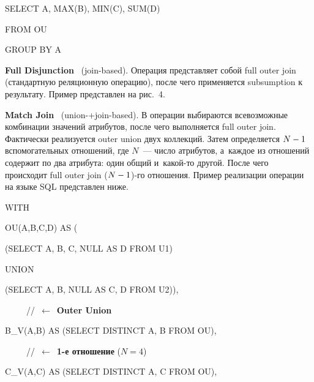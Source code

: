 \begin{multicols}{2}
\noindent
\hspace*{12pt}{\sf UNION (ALL)}

\noindent
\hspace*{3pt}{\sf (SELECT A, B, NULL AS C, D FROM U2)),}


\noindent
{\sf SELECT A, MAX(B),  MIN(C), SUM(D)}

\noindent
{\sf FROM 	OU}

\noindent
{\sf GROUP BY A}

\smallskip

\textbf{Full Disjunction}~\cite{37-vov} (join-based). Операция представляет собой
{\sf full outer join} (стандартную реляционную операцию), после чего
применяется {\sf subsumption} к результату. Пример представлен на рис.~4.



  \textbf{Match Join}~\cite{11-vov} (union-\;+\;join-based). В операции выбираются
всевозможные комбинации значений атрибутов, после чего выполняется
{\sf full
outer join}. Фактически реализуется {\sf outer union} двух коллекций. Затем
определяется $N\hm-1$ вспомогательных отношений, где $N$~--- число атрибутов,
  а~каж\-дое из отношений содержит по два атрибута: один общий и~какой-то другой.
После чего происходит {\sf full outer join} ($N\hm-1$)-го отношения. Пример
реализации операции на языке SQL представлен ниже.

\smallskip

\noindent
{\sf   WITH}

\noindent
{\sf   \hspace*{3pt}OU(A,B,C,D) AS (}

\noindent
{\sf   \hspace*{3pt}(SELECT A, B, C, NULL AS D FROM U1)}

\noindent
{\sf  \hspace*{6pt}UNION}

\noindent
{\sf   \hspace*{3pt}(SELECT  A, B, NULL AS C, D FROM U2))},

\noindent
\ \ \ \ \ //\ $\leftarrow$\ \textbf{Outer Union}

\noindent
{\sf   \hspace*{3pt}B\_V(A,B) AS (SELECT DISTINCT A, B FROM OU)},


\noindent
\ \ \ \ \  //\ $\leftarrow$\ \textbf{1-е отношение} ($N=4$)

\noindent
  {\sf \hspace*{3pt}C\_V(A,C) AS (SELECT DISTINCT A, C FROM OU)},


\end{multicols}
